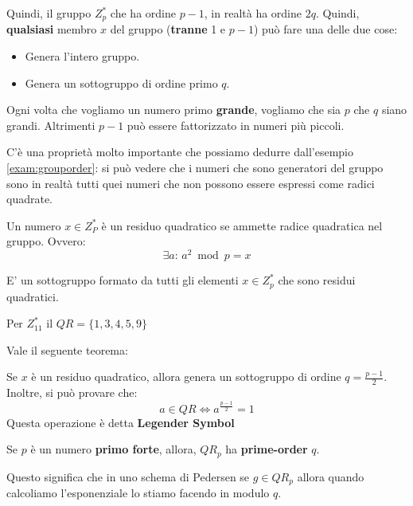 Quindi, il gruppo $Z_p^*$ che ha ordine $p-1$, in realtà ha ordine $2q$. Quindi, \textbf{qualsiasi} membro $x$ del gruppo (\textbf{tranne} 1 e $p-1$) può fare una delle due cose:
\begin{itemize}
    \item Genera l'intero gruppo.
    \item Genera un sottogruppo di ordine primo $q$.
\end{itemize}
\begin{note}
Ogni volta che vogliamo un numero primo \textbf{grande}, vogliamo che sia $p$ che $q$ siano grandi. Altrimenti $p-1$ può essere fattorizzato in numeri più piccoli. 
\end{note}
\begin{remark}
C'è una proprietà molto importante che possiamo dedurre dall'esempio \ref{exam:grouporder}: si può vedere che i numeri che sono generatori del gruppo sono in realtà tutti quei numeri che non possono essere espressi come radici quadrate.
\end{remark}
\begin{definition}\label{def:quadres}
Un numero $x\in Z_P^*$ è un residuo quadratico se ammette radice quadratica nel gruppo. Ovvero:\[\exists a:\,a^2\bmod{p}=x\]
\end{definition}
\begin{definition}\label{def:qr}
E' un sottogruppo formato da tutti gli elementi $x\in Z_p^*$ che sono residui quadratici.
\end{definition}
\begin{example}
Per $Z_{11}^*$ il $QR=\{1,3,4,5,9\}$
\end{example}
Vale il seguente teorema:
\begin{theorem}
Se $x$ è un residuo quadratico, allora genera un sottogruppo di ordine $q=\frac{p-1}{2}$.\\
Inoltre, si può provare che:
\[a\in{QR}\Longleftrightarrow a^{\frac{p-1}{2}}=1\]
Questa operazione è detta \textbf{Legender Symbol}
\end{theorem}
\begin{corollary}
Se $p$ è un numero \textbf{primo forte}, allora, $QR_p$ ha \textbf{prime-order} $q$.
\end{corollary}
\begin{note}
Questo significa che in uno schema di Pedersen se $g\in {QR_p}$ allora quando calcoliamo l'esponenziale lo stiamo facendo in modulo $q$.
\end{note}
\pagebreak
